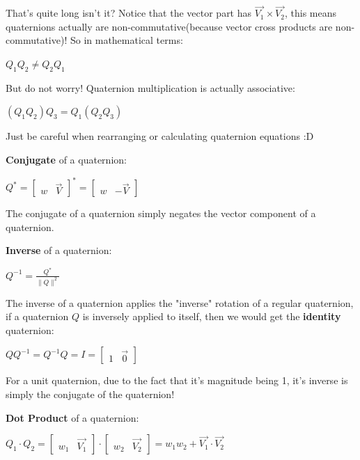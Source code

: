 That's quite long isn't it? Notice that the vector part has $\vec{V_1} \times \vec{V_2}$, this means
quaternions actually are non-commutative(because vector cross products are non-commutative)! So in mathematical terms:

\begin{center}
    $Q_1Q_2 \neq Q_2Q_1$
\end{center}

But do not worry! Quaternion multiplication is actually associative:
\begin{center}
    $(Q_1Q_2)Q_3 = Q_1(Q_2Q_3)$
\end{center}

Just be careful when rearranging or calculating quaternion equations :D


\sgap
\textbf{Conjugate} of a quaternion:
\begin{center}
    $Q^* = \begin{bmatrix}w & \vec{V}\end{bmatrix}^* =\begin{bmatrix}w & -\vec{V}\end{bmatrix}$
\end{center}

The conjugate of a quaternion simply negates the vector component of a quaternion.

\sgap
\textbf{Inverse} of a quaternion:
\begin{center}
    $Q^{-1} = \frac{Q^*}{\|Q\|^2}$
\end{center}

The inverse of a quaternion applies the "inverse" rotation of a regular quaternion,
if a quaternion $Q$ is inversely applied to itself, then we would get the \textbf{identity} quaternion:
\begin{center}
    $QQ^{-1} = Q^{-1}Q = I = \begin{bmatrix}1 & \vec{0}\end{bmatrix}$
\end{center}

For a unit quaternion, due to the fact that it's magnitude being 1, it's inverse
is simply the conjugate of the quaternion!

\sgap
\textbf{Dot Product} of a quaternion:
\begin{center}
    $Q_1 \cdot Q_2 = \begin{bmatrix}w_1 & \vec{V_1}\end{bmatrix} \cdot \begin{bmatrix}w_2 & \vec{V_2}\end{bmatrix} = w_1w_2 + \vec{V_1} \cdot \vec{V_2}$
\end{center}

